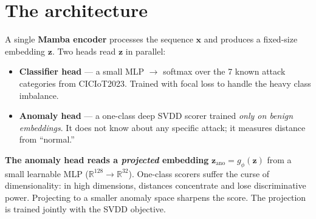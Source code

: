 \documentclass[11pt,a4paper]{article}
\begin{document}
\section{The architecture}

A single \textbf{Mamba encoder} processes the sequence $\mathbf{x}$ and produces a fixed-size embedding $\mathbf{z}$. Two heads read $\mathbf{z}$ in parallel:

\begin{itemize}[leftmargin=*, itemsep=2pt]
  \item \textbf{Classifier head} --- a small MLP $\to$ softmax over the 7 known attack categories from CICIoT2023. Trained with focal loss to handle the heavy class imbalance.
  \item \textbf{Anomaly head} --- a one-class deep SVDD scorer trained \emph{only on benign embeddings}. It does not know about any specific attack; it measures distance from ``normal.''
\end{itemize}

\begin{tcolorbox}[idea]
\textbf{The anomaly head reads a \emph{projected} embedding} $\mathbf{z}_\text{ano} = g_\phi(\mathbf{z})$ from a small learnable MLP ($\mathbb{R}^{128} \to \mathbb{R}^{32}$). One-class scorers suffer the curse of dimensionality: in high dimensions, distances concentrate and lose discriminative power. Projecting to a smaller anomaly space sharpens the score. The projection is trained jointly with the SVDD objective.
\end{tcolorbox}
\end{document}
